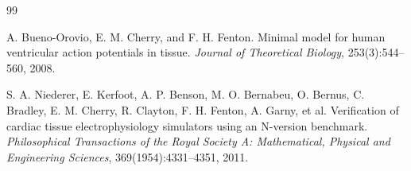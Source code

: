 \documentclass{Configuration_Files/PoliMi3i_thesis}
\begin{document}
\begin{thebibliography}{99}

A. Bueno-Orovio, E. M. Cherry, and F. H. Fenton. Minimal model for human ventricular action potentials in tissue. \textit{Journal of Theoretical Biology}, 253(3):544--560, 2008.

S. A. Niederer, E. Kerfoot, A. P. Benson, M. O. Bernabeu, O. Bernus, C. Bradley, E. M. Cherry, R. Clayton, F. H. Fenton, A. Garny, et al. Verification of cardiac tissue electrophysiology simulators using an N-version benchmark. \textit{Philosophical Transactions of the Royal Society A: Mathematical, Physical and Engineering Sciences}, 369(1954):4331--4351, 2011.

\end{thebibliography}
\end{document}
